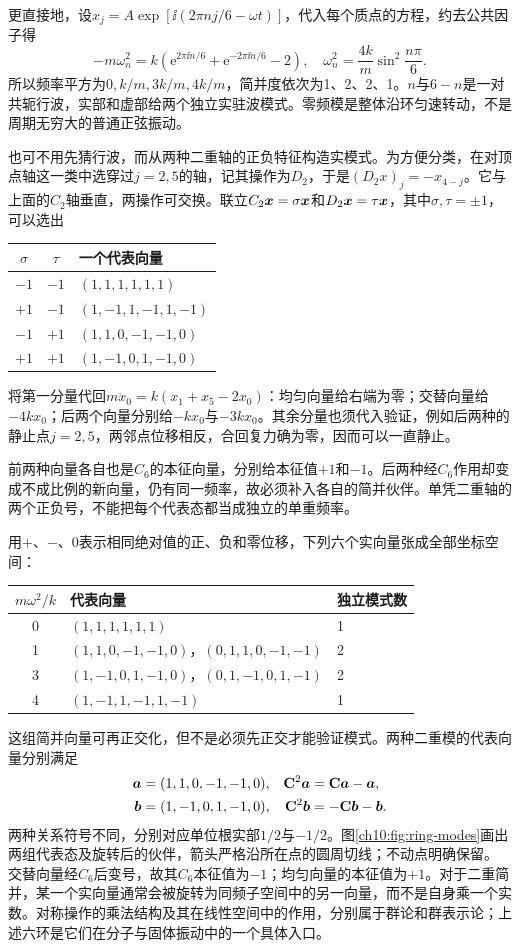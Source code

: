更直接地，设$x_j=A\exp[\ii(2\pi nj/6-\omega t)]$，代入每个质点的方程，约去公共因子得
\[
 -m\omega_n^2=k(\mathrm e^{2\pi\ii n/6}+\mathrm e^{-2\pi\ii n/6}-2),
 \quad\omega_n^2=\frac{4k}{m}\sin^2\frac{n\pi}{6}.
\]
所以频率平方为$0,k/m,3k/m,4k/m$，简并度依次为1、2、2、1。$n$与$6-n$是一对共轭行波，实部和虚部给两个独立实驻波模式。零频模是整体沿环匀速转动，不是周期无穷大的普通正弦振动。

也可不用先猜行波，而从两种二重轴的正负特征构造实模式。为方便分类，在对顶点轴这一类中选穿过$j=2,5$的轴，记其操作为$D_2$，于是$(D_2x)_j=-x_{4-j}$。它与上面的$C_2$轴垂直，两操作可交换。联立$C_2\bm{x}=\sigma\bm{x}$和$D_2\bm{x}=\tau\bm{x}$，其中$\sigma,\tau=\pm1$，可以选出
\begin{center}\small
\begin{tabular}{ccl}
\toprule $\sigma$&$\tau$&一个代表向量\\\midrule
$-1$&$-1$&$(1,1,1,1,1,1)$\\
$+1$&$-1$&$(1,-1,1,-1,1,-1)$\\
$-1$&$+1$&$(1,1,0,-1,-1,0)$\\
$+1$&$+1$&$(1,-1,0,1,-1,0)$\\\bottomrule
\end{tabular}\end{center}
将第一分量代回$m\ddot x_0=k(x_1+x_5-2x_0)$：均匀向量给右端为零；交替向量给$-4kx_0$；后两个向量分别给$-kx_0$与$-3kx_0$。其余分量也须代入验证，例如后两种的静止点$j=2,5$，两邻点位移相反，合回复力确为零，因而可以一直静止。

前两种向量各自也是$C_6$的本征向量，分别给本征值$+1$和$-1$。后两种经$C_6$作用却变成不成比例的新向量，仍有同一频率，故必须补入各自的简并伙伴。单凭二重轴的两个正负号，不能把每个代表态都当成独立的单重频率。

用$+$、$-$、0表示相同绝对值的正、负和零位移，下列六个实向量张成全部坐标空间：
\begin{center}\small
\begin{tabular}{cll}
\toprule
$m\omega^2/k$&代表向量&独立模式数\\\midrule
0&$(1,1,1,1,1,1)$&1\\
1&$(1,1,0,-1,-1,0)$，$(0,1,1,0,-1,-1)$&2\\
3&$(1,-1,0,1,-1,0)$，$(0,1,-1,0,1,-1)$&2\\
4&$(1,-1,1,-1,1,-1)$&1\\\bottomrule
\end{tabular}\end{center}
这组简并向量可再正交化，但不是必须先正交才能验证模式。两种二重模的代表向量分别满足
\[
 \begin{aligned}
 \bm{a}&=(1,1,0,-1,-1,0),&\mathbf C^2\bm{a}&=\mathbf C\bm{a}-\bm{a},\\
 \bm{b}&=(1,-1,0,1,-1,0),&\mathbf C^2\bm{b}&=-\mathbf C\bm{b}-\bm{b}.
 \end{aligned}
\]
两种关系符号不同，分别对应单位根实部$1/2$与$-1/2$。图\ref{ch10:fig:ring-modes}画出两组代表态及旋转后的伙伴，箭头严格沿所在点的圆周切线；不动点明确保留。
\chTenRingModesFigure
交替向量经$C_6$后变号，故其$C_6$本征值为$-1$；均匀向量的本征值为$+1$。对于二重简并，某一个实向量通常会被旋转为同频子空间中的另一向量，而不是自身乘一个实数。对称操作的乘法结构及其在线性空间中的作用，分别属于群论和群表示论；上述六环是它们在分子与固体振动中的一个具体入口。


